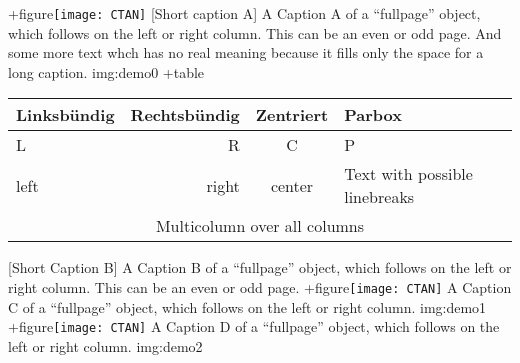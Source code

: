 \documentclass{scrartcl}
\begin{document}
\Float[Multi]
\captionsetup{singlelinecheck=false}
\hvFloat[fullpage,capPos=after,multiFloat,vFill]%
  +{figure}{\texttt{[image: CTAN]}}%
   [Short caption A]%
   {A Caption A of a ``fullpage'' object, which follows on the left or
    right column. This can be an even or odd page. And some more text whch has no
    real meaning because it fills only the space for a long caption.}%
   {img:demo0}%
  +{table}{\begin{tabular}{lrcp{3cm}}\hline                 %
            Linksbündig & Rechtsbündig & Zentriert & Parbox\\\hline
            L           & R            & C         & P\\
            left        & right        & center    & Text with possible linebreaks\\
            \multicolumn{4}{c}{Multicolumn over all columns}\\\hline
           \end{tabular}}%
   [Short Caption B]%
   {A Caption B of a ``fullpage'' object, which follows on the left or
        right column. This can be an even or odd page.}{}%
  +{figure}{\texttt{[image: CTAN]}}%
   {A Caption C of a ``fullpage'' object, which follows on the left or
      right column.}%
   {img:demo1}
  +{figure}{\texttt{[image: CTAN]}}%
   {A Caption D of a ``fullpage'' object, which follows on the left or
      right column.}%
   {img:demo2}



\Blindtext
\end{document}
